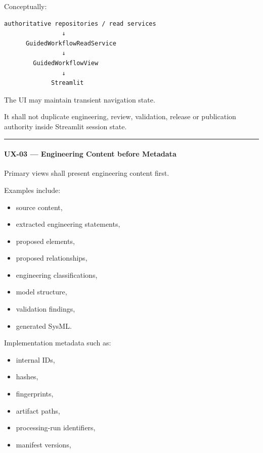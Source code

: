 Conceptually:

\begin{verbatim}
authoritative repositories / read services
                ↓
      GuidedWorkflowReadService
                ↓
        GuidedWorkflowView
                ↓
             Streamlit
\end{verbatim}

The UI may maintain transient navigation state.

It shall not duplicate engineering, review, validation, release or publication authority inside Streamlit session state.

\begin{center}\rule{0.5\linewidth}{0.5pt}\end{center}

\hypertarget{ux-03--engineering-content-before-metadata}{%
\paragraph{UX-03 --- Engineering Content before Metadata}\label{ux-03--engineering-content-before-metadata}}

Primary views shall present engineering content first.

Examples include:

\begin{itemize}
\tightlist
\item
  source content,
\item
  extracted engineering statements,
\item
  proposed elements,
\item
  proposed relationships,
\item
  engineering classifications,
\item
  model structure,
\item
  validation findings,
\item
  generated SysML.
\end{itemize}

Implementation metadata such as:

\begin{itemize}
\tightlist
\item
  internal IDs,
\item
  hashes,
\item
  fingerprints,
\item
  artifact paths,
\item
  processing-run identifiers,
\item
  manifest versions,
\end{itemize}

